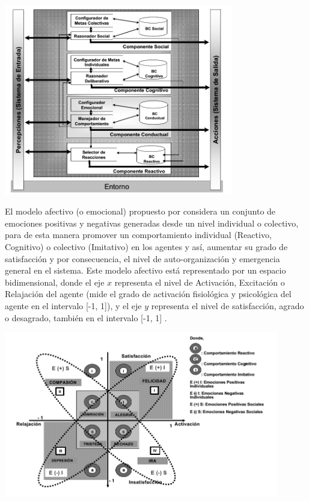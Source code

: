 \begin{ilustracion}[fuente=\cite{perozo2011}, etiqueta=componentes-masoes-individual, titulo={Componentes de MASOES a Nivel Individual}]
\includegraphics[width=10cm]{ilustraciones/marco-teorico/componentes-masoes-individual.jpg}
\end{ilustracion}


El modelo afectivo (o emocional) propuesto por \citeauthor{perozo2011} considera un conjunto de
emociones positivas y negativas generadas desde un nivel individual o colectivo,
para de esta manera promover un comportamiento individual (Reactivo, Cognitivo)
o colectivo (Imitativo) en los agentes y así, aumentar su grado de satisfacción
y por consecuencia, el nivel de auto-organización y emergencia general en el
sistema. Este modelo afectivo está representado por un espacio bidimensional,
donde el eje $x$ representa el nivel de Activación, Excitación o Relajación del
agente (mide el grado de activación fisiológica y psicológica del agente en el
intervalo [-1, 1]), y el eje $y$ representa el nivel de satisfacción, agrado o
desagrado, también en el intervalo [-1, 1] .

\begin{ilustracion}[fuente=\cite{perozo2011}, etiqueta=modelo-afectivo, titulo={Modelo Afectivo para MASOES}]
\includegraphics[width=12cm]{ilustraciones/marco-teorico/modelo-afectivo.jpg}
\end{ilustracion}

